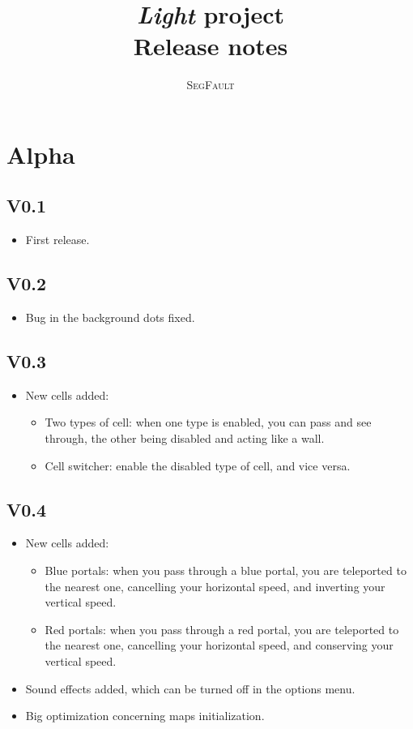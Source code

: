 \documentclass[a4paper,12pt]{article}
\begin{document}
\title{\textit{Light} project\\Release notes}
\author{\textsc{SegFault}}
\maketitle
\section*{Alpha}
\subsection*{V0.1}
\begin{itemize}
\item First release.
\end{itemize}
\subsection*{V0.2}
\begin{itemize}
\item Bug in the background dots fixed.
\end{itemize}
\subsection*{V0.3}
\begin{itemize}
\item New cells added:
\begin{itemize}
\item Two types of cell: when one type is enabled, you can pass and see through, the other being disabled and acting like a wall.
\item Cell switcher: enable the disabled type of cell, and vice versa.
\end{itemize}
\end{itemize}
\subsection*{V0.4}
\begin{itemize}
\item New cells added:
\begin{itemize}
\item Blue portals: when you pass through a blue portal, you are teleported to the nearest one, cancelling your horizontal speed, and inverting your vertical speed.
\item Red portals: when you pass through a red portal, you are teleported to the nearest one, cancelling your horizontal speed, and conserving your vertical speed.
\end{itemize}
\item Sound effects added, which can be turned off in the options menu.
\item Big optimization concerning maps initialization.
\end{itemize}
\end{document}

